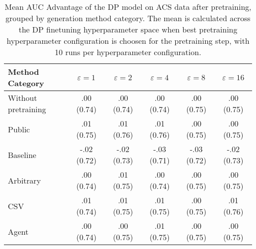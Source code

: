 \begin{table}[h!]
    \centering
    \caption{Mean AUC Advantage of the DP model on ACS data after pretraining, grouped by generation method category. The mean is calculated across the DP finetuning hyperparameter space when best pretraining hyperparameter configuration is choosen for the pretraining step, with 10 runs per hyperparameter configuration.}
    \label{tab:epsilon_comparison}
    \begin{tabular}{lccccc}
    \toprule
    Method Category & $\varepsilon=1$ & $\varepsilon=2$ & $\varepsilon=4$ & $\varepsilon=8$ & $\varepsilon=16$ \\
    \midrule
    Without pretraining & .00 {\small (0.74)} & .00 {\small (0.74)} & .00 {\small (0.74)} & .00 {\small (0.75)} & .00 {\small (0.75)} \\
    \arrayrulecolor{black!50!}\midrule
    Public & \cellcolor{gold!30}.01 {\small (0.75)} & \cellcolor{gold!30}.01 {\small (0.76)} & \cellcolor{gold!30}.01 {\small (0.76)} & \cellcolor{gold!30}.00 {\small (0.75)} & \cellcolor{silver!30}.00 {\small (0.75)} \\
    \arrayrulecolor{black!50!}\midrule
    Baseline & -.02 {\small (0.72)} & -.02 {\small (0.73)} & -.03 {\small (0.71)} & -.03 {\small (0.72)} & -.02 {\small (0.73)} \\
    \arrayrulecolor{black!50!}\midrule
    Arbitrary & .00 {\small (0.74)} & \cellcolor{bronze!30}.01 {\small (0.75)} & .00 {\small (0.74)} & \cellcolor{bronze!30}.00 {\small (0.75)} & \cellcolor{bronze!30}.00 {\small (0.75)} \\
    \arrayrulecolor{black!50!}\midrule
    CSV & \cellcolor{silver!30}.01 {\small (0.74)} & \cellcolor{silver!30}.01 {\small (0.75)} & \cellcolor{silver!30}.01 {\small (0.75)} & \cellcolor{gold!30}.00 {\small (0.75)} & \cellcolor{gold!30}.01 {\small (0.76)} \\
    Agent & \cellcolor{bronze!30}.00 {\small (0.74)} & .00 {\small (0.75)} & \cellcolor{bronze!30}.01 {\small (0.75)} & \cellcolor{silver!30}.00 {\small (0.75)} & \cellcolor{silver!30}.00 {\small (0.75)} \\
    \bottomrule
    \end{tabular}
\end{table}